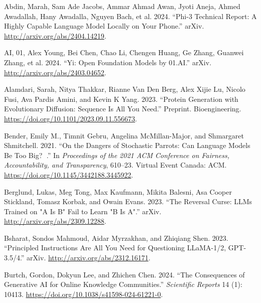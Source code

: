 \documentclass[
  Letterpaper,
]{scrbook}
\newlength{\cslhangindent}
\newenvironment{CSLReferences}[2] %
 {\begin{list}{}{%
  \setlength{\itemindent}{0pt}
  \setlength{\leftmargin}{0pt}
  \setlength{\parsep}{0pt}
  \ifodd #1
   \setlength{\leftmargin}{\cslhangindent}
   \setlength{\itemindent}{-1\cslhangindent}
  \fi
  \setlength{\itemsep}{#2\baselineskip}}}
 {\end{list}}
\begin{document}

\label{refs}
\begin{CSLReferences}{1}{0}
Abdin, Marah, Sam Ade Jacobs, Ammar Ahmad Awan, Jyoti Aneja, Ahmed
Awadallah, Hany Awadalla, Nguyen Bach, et al. 2024. {``Phi-3 {Technical}
{Report}: {A} {Highly} {Capable} {Language} {Model} {Locally} on {Your}
{Phone}.''} arXiv. \url{http://arxiv.org/abs/2404.14219}.

AI, 01, Alex Young, Bei Chen, Chao Li, Chengen Huang, Ge Zhang, Guanwei
Zhang, et al. 2024. {``Yi: {Open} {Foundation} {Models} by 01.{AI}.''}
arXiv. \url{http://arxiv.org/abs/2403.04652}.

Alamdari, Sarah, Nitya Thakkar, Rianne Van Den Berg, Alex Xijie Lu,
Nicolo Fusi, Ava Pardis Amini, and Kevin K Yang. 2023. {``Protein
Generation with Evolutionary Diffusion: Sequence Is All You Need.''}
Preprint. Bioengineering.
\url{https://doi.org/10.1101/2023.09.11.556673}.

Bender, Emily M., Timnit Gebru, Angelina McMillan-Major, and Shmargaret
Shmitchell. 2021. {``On the {Dangers} of {Stochastic} {Parrots}: {Can}
{Language} {Models} {Be} {Too} {Big}? 🦜.''} In \emph{Proceedings of the
2021 {ACM} {Conference} on {Fairness}, {Accountability}, and
{Transparency}}, 610--23. Virtual Event Canada: ACM.
\url{https://doi.org/10.1145/3442188.3445922}.

Berglund, Lukas, Meg Tong, Max Kaufmann, Mikita Balesni, Asa Cooper
Stickland, Tomasz Korbak, and Owain Evans. 2023. {``The {Reversal}
{Curse}: {LLMs} Trained on "{A} Is {B}" Fail to Learn "{B} Is {A}".''}
arXiv. \url{http://arxiv.org/abs/2309.12288}.

Bsharat, Sondos Mahmoud, Aidar Myrzakhan, and Zhiqiang Shen. 2023.
{``Principled {Instructions} {Are} {All} {You} {Need} for {Questioning}
{LLaMA}-1/2, {GPT}-3.5/4.''} arXiv.
\url{http://arxiv.org/abs/2312.16171}.

Burtch, Gordon, Dokyun Lee, and Zhichen Chen. 2024. {``The Consequences
of Generative {AI} for Online Knowledge Communities.''} \emph{Scientific
Reports} 14 (1): 10413.
\url{https://doi.org/10.1038/s41598-024-61221-0}.


\end{CSLReferences}
\end{document}

